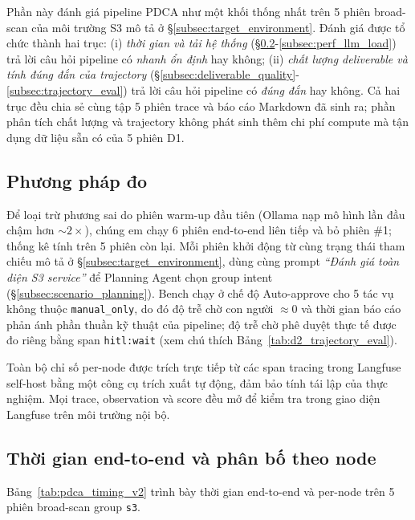 Phần này đánh giá pipeline PDCA như một khối thống nhất trên 5 phiên broad-scan của môi trường S3 mô tả ở \S\ref{subsec:target_environment}. Đánh giá được tổ chức thành hai trục: (i) \emph{thời gian và tải hệ thống} (\S\ref{subsec:perf_e2e}-\ref{subsec:perf_llm_load}) trả lời câu hỏi pipeline có \emph{nhanh ổn định} hay không; (ii) \emph{chất lượng deliverable và tính đúng đắn của trajectory} (\S\ref{subsec:deliverable_quality}-\ref{subsec:trajectory_eval}) trả lời câu hỏi pipeline có \emph{đúng đắn} hay không. Cả hai trục đều chia sẻ cùng tập 5 phiên trace và báo cáo Markdown đã sinh ra; phần phân tích chất lượng và trajectory không phát sinh thêm chi phí compute mà tận dụng dữ liệu sẵn có của 5 phiên D1.

\subsection{Phương pháp đo}
\label{subsec:perf_method}

Để loại trừ phương sai do phiên warm-up đầu tiên (Ollama nạp mô hình lần đầu chậm hơn $\sim 2\times$), chúng em chạy 6 phiên end-to-end liên tiếp và bỏ phiên \#1; thống kê tính trên 5 phiên còn lại. Mỗi phiên khởi động từ cùng trạng thái tham chiếu mô tả ở \S\ref{subsec:target_environment}, dùng cùng prompt \textit{``Đánh giá toàn diện S3 service''} để Planning Agent chọn group intent (\S\ref{subsec:scenario_planning}). Bench chạy ở chế độ Auto-approve cho 5 tác vụ không thuộc \texttt{manual\_only}, do đó độ trễ chờ con người $\approx 0$ và thời gian báo cáo phản ánh phần thuần kỹ thuật của pipeline; độ trễ chờ phê duyệt thực tế được đo riêng bằng span \texttt{hitl:wait} (xem chú thích Bảng~\ref{tab:d2_trajectory_eval}).

Toàn bộ chỉ số per-node được trích trực tiếp từ các span tracing trong Langfuse self-host bằng một công cụ trích xuất tự động, đảm bảo tính tái lập của thực nghiệm. Mọi trace, observation và score đều mở để kiểm tra trong giao diện Langfuse trên môi trường nội bộ.

\subsection{Thời gian end-to-end và phân bố theo node}
\label{subsec:perf_e2e}

Bảng~\ref{tab:pdca_timing_v2} trình bày thời gian end-to-end và per-node trên 5 phiên broad-scan group \texttt{s3}.



